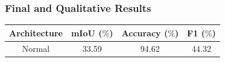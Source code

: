 \documentclass{beamer}
\begin{document}
\begin{frame}
\frametitle{Final and Qualitative Results}

\begin{table}[h!]
  \begin{center}
    
    \begin{tabular}{|c|c|c|c|} %
      \textbf{Architecture} & \textbf{mIoU ($\%$)} & \textbf{Accuracy ($\%$)} & \textbf{F1 ($\%$)} \\
      \hline
      Normal & 33.59 & 94.62 & 44.32\\
    \end{tabular}
   
    \label{segnet:table3}
  \end{center}
\end{table}


\end{frame}
\end{document}
